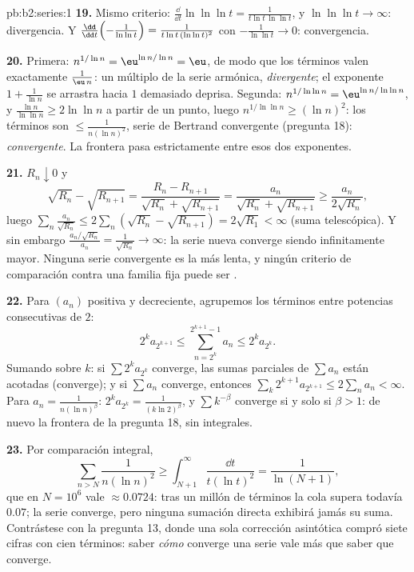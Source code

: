 \begin{solution}{pb:b2:series:1}
\textbf{19.} Mismo criterio: $\frac{\dd}{\dd t}\ln\ln\ln t =
\frac{1}{t\ln t\,\ln\ln t}$, y $\ln\ln\ln t \to \infty$:
divergencia. Y $\frac{\dd}{\dd t}\Bigl(-\frac1{\ln\ln t}\Bigr) =
\frac{1}{t\ln t\,(\ln\ln t)^2}$ con $-\frac1{\ln\ln t} \to 0$:
convergencia.

\textbf{20.} Primera: $n^{1/\ln n} = \eu^{\ln n/\ln n} = \eu$, de
modo que los términos valen exactamente $\frac{1}{\eu\,n}$: un
múltiplo de la serie armónica, \emph{divergente}; el exponente $1
+ \frac1{\ln n}$ se arrastra hacia $1$ demasiado deprisa.
Segunda: $n^{1/\ln\ln n} = \eu^{\ln n/\ln\ln n}$, y $\frac{\ln
n}{\ln\ln n} \geq 2\ln\ln n$ a partir de un punto, luego
$n^{1/\ln\ln n} \geq (\ln n)^2$: los términos son $\leq
\frac1{n(\ln n)^2}$, serie de Bertrand convergente (pregunta 18):
\emph{convergente}. La frontera pasa estrictamente entre esos dos
exponentes.

\textbf{21.} $R_n \downarrow 0$ y
\[
\sqrt{R_n} - \sqrt{R_{n+1}} = \frac{R_n -
R_{n+1}}{\sqrt{R_n} + \sqrt{R_{n+1}}} =
\frac{a_n}{\sqrt{R_n} + \sqrt{R_{n+1}}} \geq
\frac{a_n}{2\sqrt{R_n}},
\]
luego $\sum_n \frac{a_n}{\sqrt{R_n}} \leq 2\sum_n(\sqrt{R_n} -
\sqrt{R_{n+1}}) = 2\sqrt{R_1} < \infty$ (suma telescópica). Y sin
embargo $\frac{a_n/\sqrt{R_n}}{a_n} = \frac1{\sqrt{R_n}} \to
\infty$: la serie nueva converge siendo infinitamente mayor.
Ninguna serie convergente es la más lenta, y ningún criterio de
comparación contra una familia fija puede ser .

\textbf{22.} Para $(a_n)$ positiva y decreciente, agrupemos los
términos entre potencias consecutivas de $2$:
\[
2^{k}a_{2^{k+1}} \leq \sum_{n=2^k}^{2^{k+1}-1} a_n \leq
2^ka_{2^k} .
\]
Sumando sobre $k$: si $\sum 2^ka_{2^k}$ converge, las sumas
parciales de $\sum a_n$ están acotadas (converge); y si $\sum
a_n$ converge, entonces $\sum_k 2^{k+1}a_{2^{k+1}} \leq 2\sum_n
a_n < \infty$. Para $a_n = \frac1{n(\ln n)^\beta}$: $2^ka_{2^k} =
\frac{1}{(k\ln 2)^\beta}$, y $\sum k^{-\beta}$ converge si y solo
si $\beta > 1$: de nuevo la frontera de la pregunta 18, sin
integrales.

\textbf{23.} Por comparación integral,
\[
\sum_{n > N}\frac{1}{n(\ln n)^2} \geq
\int_{N+1}^{\infty}\frac{\dd t}{t(\ln t)^2} =
\frac{1}{\ln(N+1)},
\]
que en $N = 10^6$ vale $\approx 0.0724$: tras un millón de
términos la cola supera todavía $0.07$; la serie converge, pero
ninguna sumación directa exhibirá jamás su suma. Contrástese con
la pregunta 13, donde una sola corrección asintótica compró siete
cifras con cien términos: saber \emph{cómo} converge una serie
vale más que saber que converge.


\end{solution}
